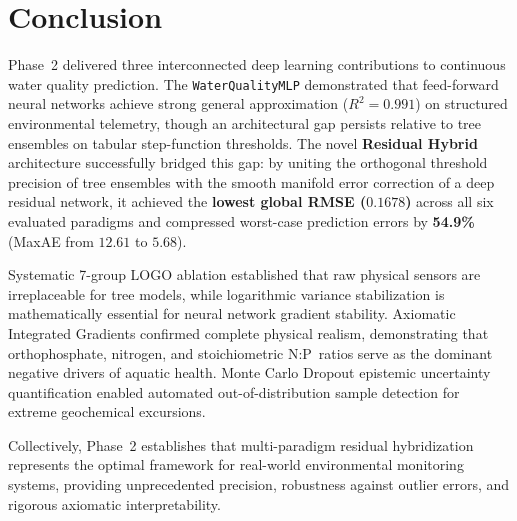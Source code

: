 \documentclass[conference]{IEEEtran}
\begin{document}
\section{Conclusion}
\label{sec:conclusion}

Phase~2 delivered three interconnected deep learning contributions to continuous water quality prediction.
The \texttt{WaterQualityMLP} demonstrated that feed-forward neural networks achieve strong general approximation
($R^2 = 0.991$) on structured environmental telemetry, though an architectural gap persists relative to tree
ensembles on tabular step-function thresholds. The novel \textbf{Residual Hybrid} architecture successfully
bridged this gap: by uniting the orthogonal threshold precision of tree ensembles with the smooth manifold
error correction of a deep residual network, it achieved the \textbf{lowest global RMSE ($0.1678$)} across all
six evaluated paradigms and compressed worst-case prediction errors by \textbf{54.9\%} (MaxAE from $12.61$ to $5.68$).

Systematic 7-group LOGO ablation established that raw physical sensors are irreplaceable for tree models,
while logarithmic variance stabilization is mathematically essential for neural network gradient stability.
Axiomatic Integrated Gradients confirmed complete physical realism, demonstrating that orthophosphate,
nitrogen, and stoichiometric $\text{N}:\text{P}$ ratios serve as the dominant negative drivers of aquatic health.
Monte Carlo Dropout epistemic uncertainty quantification enabled automated out-of-distribution sample detection
for extreme geochemical excursions.

Collectively, Phase~2 establishes that multi-paradigm residual hybridization represents the optimal framework
for real-world environmental monitoring systems, providing unprecedented precision, robustness against outlier
errors, and rigorous axiomatic interpretability.

\balance


\end{document}
